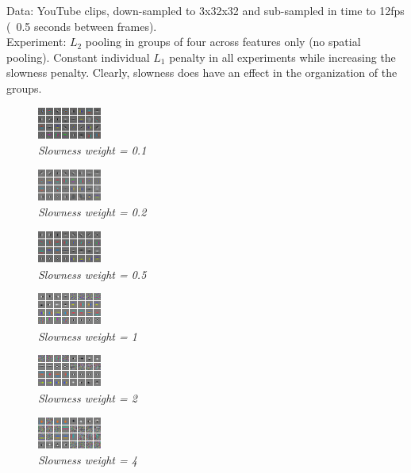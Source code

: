 \documentclass[12pt,a4paper]{report}
\begin{document}
 
\def\scale{4}
\noindent 
Data: YouTube clips, down-sampled to 3x32x32 and sub-sampled in time to 12fps (~0.5 seconds between frames). \\
Experiment: $L_2$ pooling in groups of four across features only (no spatial pooling). Constant individual $L_1$ penalty in all experiments while increasing the slowness penalty. 
Clearly, slowness does have an effect in the organization of the groups.    
\begin{figure}[h]
\centering
\includegraphics[scale=\scale]{SF01.png}
\caption{\emph{Slowness weight = 0.1}}
\end{figure} 

\begin{figure}[h]
\centering
\includegraphics[scale=\scale]{SF02.png}
\caption{\emph{Slowness weight = 0.2}}
\end{figure} 

\begin{figure}[h]
\centering
\includegraphics[scale=\scale]{SF05.png}
\caption{\emph{Slowness weight = 0.5}}
\end{figure} 

\begin{figure}[h]
\centering
\includegraphics[scale=\scale]{SF10.png}
\caption{ \emph{Slowness weight = 1}}
\end{figure} 

\begin{figure}[h]
\centering
\includegraphics[scale=\scale]{SF20.png}
\caption{ \emph{Slowness weight = 2}}
\end{figure} 

\begin{figure}[h]
\centering
\includegraphics[scale=\scale]{SF40.png}
\caption{ \emph{Slowness weight = 4}}
\end{figure} 
\end{document}
